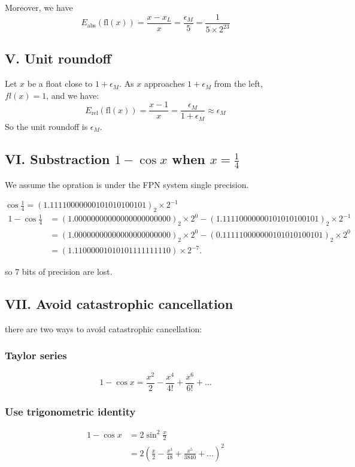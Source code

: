 \documentclass[a4paper]{article}
\newcommand{\esm}{\epsilon_M}
\newcommand{\fl}{\text{fl}}
\newcommand{\Eabs}{E_{\text{abs}}}
\newcommand{\Erel}{E_{\text{rel}}}
\begin{document}
Moreover, we have 
\[\Eabs(\fl(x)) = \frac{x- x_L}{x} = \frac{\esm}{5} = \frac{1}{5\times 2^{23}}\]

\subsection*{V. Unit roundoff}
Let $x$ be a float close to $1 + \esm$. As $x$ approaches $1 + \esm$ from the left, $fl(x) = 1$, and we have:
\[\Erel(\fl(x)) = \frac{x-1}{x} = \frac{\esm}{1 + \esm} \approx \esm\]
So the unit roundoff is $\esm$.

\subsection*{VI. Substraction $1 - \cos x$ when $x = \frac{1}{4}$}
We assume the opration is under the FPN system single precision.

$\cos \frac{1}{4} = (1.111 1000 0000 1010 1010 0101)_2 \times 2^{-1}$
\begin{align*}
  1 - \cos \frac{1}{4} &= (1.000 0000 0000 0000 0000 0000)_2 \times 2^0 - (1.111 1000 0000 1010 1010 0101)_2 \times 2^{-1}\\
&= (1.000 0000 0000 0000 0000 0000)_2 \times 2^0 - (0.1111 1000 0000 1010 1010 0101)_2 \times 2^{0}\\
&=(1.110 0000 1010 1011 1111 1110) \times 2^{-7}.
\end{align*}

so 7 bits of precision are lost.

\subsection*{VII. Avoid catastrophic cancellation}
there are two ways to avoid catastrophic cancellation:
\subsubsection*{Taylor series}
\[  1 - \cos x = \frac{x^2}{2} - \frac{x^4}{4!} + \frac{x^6}{6!} + \dots\]

\subsubsection*{Use trigonometric identity}
\begin{align*}
  1- \cos x &=  2\sin^2\frac{x}{2}\\
&= 2\left(\frac{x}{2} - \frac{x^3}{48} + \frac{x^5}{3840} + \dots\right)^2
\end{align*}
\end{document}
